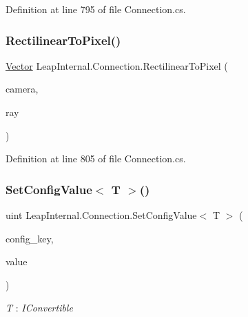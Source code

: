 Definition at line 795 of file Connection.\+cs.

\mbox{\label{class_leap_internal_1_1_connection_ac5c43c1a0c01488e8f67935e9d412117}} 
\subsubsection{\texorpdfstring{RectilinearToPixel()}{RectilinearToPixel()}}
{\footnotesize\ttfamily \mbox{\hyperlink{struct_leap_1_1_vector}{Vector}} Leap\+Internal.\+Connection.\+Rectilinear\+To\+Pixel (\begin{DoxyParamCaption}\item[{\mbox{\hyperlink{class_leap_1_1_image_a28310e43e0f2d7f7117e1b45330bdc38}{Image.\+Camera\+Type}}}]{camera,  }\item[{\mbox{\hyperlink{struct_leap_1_1_vector}{Vector}}}]{ray }\end{DoxyParamCaption})}



Definition at line 805 of file Connection.\+cs.

\mbox{\label{class_leap_internal_1_1_connection_ae223cb1838efbbe1cb1f65fcd970fe05}} 
\subsubsection{\texorpdfstring{SetConfigValue$<$ T $>$()}{SetConfigValue< T >()}}
{\footnotesize\ttfamily uint Leap\+Internal.\+Connection.\+Set\+Config\+Value$<$ T $>$ (\begin{DoxyParamCaption}\item[{string}]{config\+\_\+key,  }\item[{T}]{value }\end{DoxyParamCaption})}

\begin{Desc}
\item[Type Constraints]\begin{description}
\item[{\em T} : {\em I\+Convertible}]\end{description}
\end{Desc}


